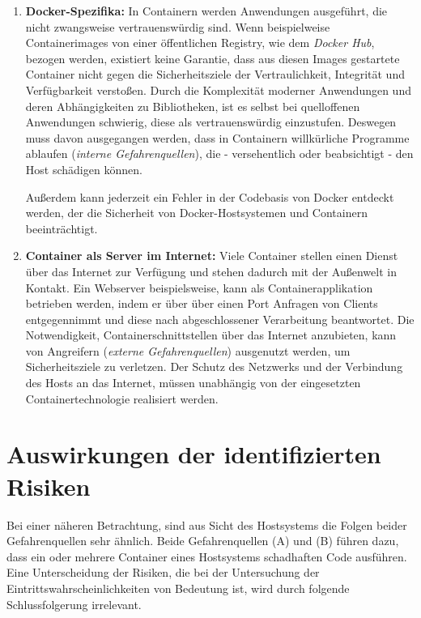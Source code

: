 \documentclass[../main.tex]{subfiles}
\begin{document}
    \begin{enumerate}[label=(\Alph*)]
      \item \textbf{Docker-Spezifika:} In Containern werden Anwendungen ausgeführt, die nicht zwangsweise vertrauenswürdig sind. Wenn beispielweise Containerimages von einer öffentlichen Registry, wie dem \emph{Docker Hub}, bezogen werden, existiert keine Garantie, dass aus diesen Images gestartete Container nicht gegen die Sicherheitsziele der Vertraulichkeit, Integrität und Verfügbarkeit verstoßen. Durch die Komplexität moderner Anwendungen und deren Abhängigkeiten zu Bibliotheken, ist es selbst bei quelloffenen Anwendungen schwierig, diese als vertrauenswürdig einzustufen. Deswegen muss davon ausgegangen werden, dass in Containern willkürliche Programme ablaufen (\emph{interne Gefahrenquellen}), die - versehentlich oder beabsichtigt - den Host schädigen können.

      Außerdem kann jederzeit ein Fehler in der Codebasis von Docker entdeckt werden, der die Sicherheit von Docker-Hostsystemen und Containern beeinträchtigt.

      \item \textbf{Container als Server im Internet:} Viele Container stellen einen Dienst über das Internet zur Verfügung und stehen dadurch mit der Außenwelt in Kontakt. Ein Webserver beispielsweise, kann als Containerapplikation betrieben werden, indem er über über einen Port Anfragen von Clients entgegennimmt und diese nach abgeschlossener Verarbeitung beantwortet. Die Notwendigkeit, Containerschnittstellen über das Internet anzubieten, kann von Angreifern (\emph{externe Gefahrenquellen}) ausgenutzt werden, um Sicherheitsziele zu verletzen. Der Schutz des Netzwerks und der Verbindung des Hosts an das Internet, müssen unabhängig von der eingesetzten Containertechnologie realisiert werden.
    \end{enumerate}

  \section{Auswirkungen der identifizierten Risiken}
  \label{questionEffects}
    Bei einer näheren Betrachtung, sind aus Sicht des Hostsystems die Folgen beider Gefahrenquellen sehr ähnlich. Beide Gefahrenquellen (A) und (B) führen dazu, dass ein oder mehrere Container eines Hostsystems schadhaften Code ausführen. Eine Unterscheidung der Risiken, die bei der Untersuchung der Eintrittswahrscheinlichkeiten von Bedeutung ist, wird durch folgende Schlussfolgerung irrelevant.
\end{document}
